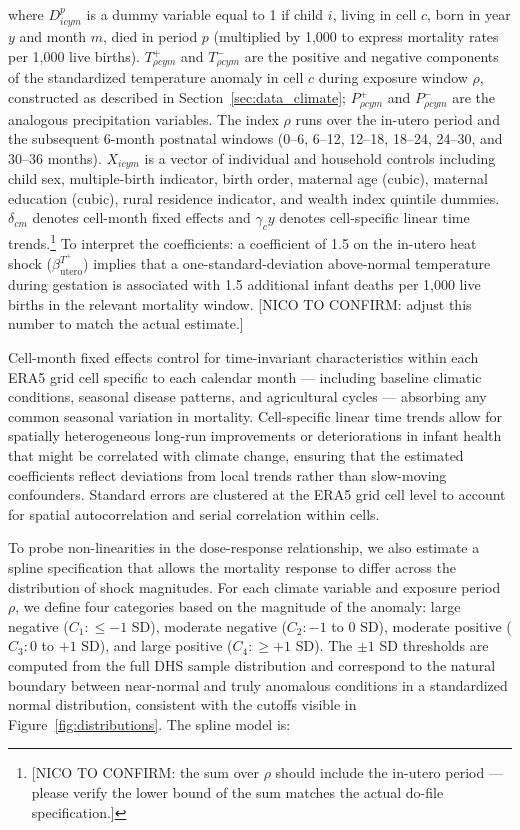 \documentclass[a4paper]{article}
\begin{document}
where $D_{icym}^p$ is a dummy variable equal to 1 if child $i$, living in cell $c$, born in year $y$ and month $m$, died in period $p$ (multiplied by 1,000 to express mortality rates per 1,000 live births). $T^+_{\rho cym}$ and $T^-_{\rho cym}$ are the positive and negative components of the standardized temperature anomaly in cell $c$ during exposure window $\rho$, constructed as described in Section~\ref{sec:data_climate}; $P^+_{\rho cym}$ and $P^-_{\rho cym}$ are the analogous precipitation variables. The index $\rho$ runs over the in-utero period and the subsequent 6-month postnatal windows (0--6, 6--12, 12--18, 18--24, 24--30, and 30--36 months). $X_{icym}$ is a vector of individual and household controls including child sex, multiple-birth indicator, birth order, maternal age (cubic), maternal education (cubic), rural residence indicator, and wealth index quintile dummies. $\delta_{cm}$ denotes cell-month fixed effects and $\gamma_{c}y$ denotes cell-specific linear time trends.\footnote{[NICO TO CONFIRM: the sum over $\rho$ should include the in-utero period — please verify the lower bound of the sum matches the actual do-file specification.]} To interpret the coefficients: a coefficient of 1.5 on the in-utero heat shock ($\beta^{T^+}_{\text{utero}}$) implies that a one-standard-deviation above-normal temperature during gestation is associated with 1.5 additional infant deaths per 1,000 live births in the relevant mortality window. [NICO TO CONFIRM: adjust this number to match the actual estimate.]

Cell-month fixed effects control for time-invariant characteristics within each ERA5 grid cell specific to each calendar month — including baseline climatic conditions, seasonal disease patterns, and agricultural cycles — absorbing any common seasonal variation in mortality. Cell-specific linear time trends allow for spatially heterogeneous long-run improvements or deteriorations in infant health that might be correlated with climate change, ensuring that the estimated coefficients reflect deviations from local trends rather than slow-moving confounders. Standard errors are clustered at the ERA5 grid cell level to account for spatial autocorrelation and serial correlation within cells.

To probe non-linearities in the dose-response relationship, we also estimate a spline specification that allows the mortality response to differ across the distribution of shock magnitudes. For each climate variable and exposure period $\rho$, we define four categories based on the magnitude of the anomaly: large negative ($C_1: \leq -1$ SD), moderate negative ($C_2: -1$ to $0$ SD), moderate positive ($C_3: 0$ to $+1$ SD), and large positive ($C_4: \geq +1$ SD). The $\pm 1$ SD thresholds are computed from the full DHS sample distribution and correspond to the natural boundary between near-normal and truly anomalous conditions in a standardized normal distribution, consistent with the cutoffs visible in Figure~\ref{fig:distributions}. The spline model is:
\end{document}
